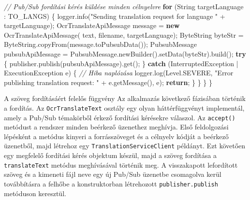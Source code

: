 \documentclass[
]{article}
\newenvironment{Shaded}{}{}
\newcommand{\BuiltInTok}[1]{\textcolor[rgb]{0.00,0.50,0.00}{#1}}
\newcommand{\CommentTok}[1]{\textcolor[rgb]{0.38,0.63,0.69}{\textit{#1}}}
\newcommand{\ControlFlowTok}[1]{\textcolor[rgb]{0.00,0.44,0.13}{\textbf{#1}}}
\newcommand{\FunctionTok}[1]{\textcolor[rgb]{0.02,0.16,0.49}{#1}}
\newcommand{\KeywordTok}[1]{\textcolor[rgb]{0.00,0.44,0.13}{\textbf{#1}}}
\newcommand{\NormalTok}[1]{#1}
\newcommand{\OperatorTok}[1]{\textcolor[rgb]{0.40,0.40,0.40}{#1}}
\newcommand{\StringTok}[1]{\textcolor[rgb]{0.25,0.44,0.63}{#1}}
\begin{document}
\begin{Shaded}
\begin{Highlighting}[]
    \CommentTok{// Pub/Sub fordítási kérés küldése minden célnyelvre}
    \ControlFlowTok{for} \OperatorTok{(}\BuiltInTok{String}\NormalTok{ targetLanguage }\OperatorTok{:}\NormalTok{ TO\_LANGS}\OperatorTok{)} \OperatorTok{\{}
\NormalTok{      logger}\OperatorTok{.}\FunctionTok{info}\OperatorTok{(}\StringTok{"Sending translation request for language "} \OperatorTok{+}\NormalTok{ targetLanguage}\OperatorTok{);}
\NormalTok{      OcrTranslateApiMessage message }\OperatorTok{=} \KeywordTok{new} \FunctionTok{OcrTranslateApiMessage}\OperatorTok{(}
\NormalTok{          text}\OperatorTok{,}\NormalTok{ filename}\OperatorTok{,}\NormalTok{ targetLanguage}\OperatorTok{);}
\NormalTok{      ByteString byteStr }\OperatorTok{=}\NormalTok{ ByteString}\OperatorTok{.}\FunctionTok{copyFrom}\OperatorTok{(}\NormalTok{message}\OperatorTok{.}\FunctionTok{toPubsubData}\OperatorTok{());}
\NormalTok{      PubsubMessage pubsubApiMessage }\OperatorTok{=}\NormalTok{ PubsubMessage}\OperatorTok{.}\FunctionTok{newBuilder}\OperatorTok{().}\FunctionTok{setData}\OperatorTok{(}\NormalTok{byteStr}\OperatorTok{).}\FunctionTok{build}\OperatorTok{();}
      \ControlFlowTok{try} \OperatorTok{\{}
\NormalTok{        publisher}\OperatorTok{.}\FunctionTok{publish}\OperatorTok{(}\NormalTok{pubsubApiMessage}\OperatorTok{).}\FunctionTok{get}\OperatorTok{();}
      \OperatorTok{\}} \ControlFlowTok{catch} \OperatorTok{(}\BuiltInTok{InterruptedException} \OperatorTok{|} \BuiltInTok{ExecutionException}\NormalTok{ e}\OperatorTok{)} \OperatorTok{\{}
        \CommentTok{// Hiba naplózása}
\NormalTok{        logger}\OperatorTok{.}\FunctionTok{log}\OperatorTok{(}\BuiltInTok{Level}\OperatorTok{.}\FunctionTok{SEVERE}\OperatorTok{,} \StringTok{"Error publishing translation request: "} \OperatorTok{+}\NormalTok{ e}\OperatorTok{.}\FunctionTok{getMessage}\OperatorTok{(),}\NormalTok{ e}\OperatorTok{);}
        \ControlFlowTok{return}\OperatorTok{;}
      \OperatorTok{\}}
    \OperatorTok{\}}
  \OperatorTok{\}}
\OperatorTok{\}}
\end{Highlighting}
\end{Shaded}

A szöveg fordításáért felelős függvény Az alkalmazás következő fázisában
történik a fordítás. Az \texttt{OcrTranslateText} osztály egy olyan
háttérfüggvényt implementál, amely a Pub/Sub témakörből érkező fordítási
kérésekre válaszol. Az \texttt{accept()} metódust a rendszer minden
beérkező üzenethez meghívja. Első feldolgozási lépésként a metódus
kinyeri a forrásszöveget és a célnyelv kódját a beérkező üzenetből, majd
létrehoz egy \texttt{TranslationServiceClient} példányt. Ezt követően
egy megfelelő fordítási kérés objektum készül, majd a szöveg fordítása a
\texttt{translateText} metódus meghívásával történik meg. A visszakapott
lefordított szöveg és a kimeneti fájl neve egy új Pub/Sub üzenetbe
csomagolva kerül továbbításra a felhőbe a konstruktorban létrehozott
\texttt{publisher.publish} metóduson keresztül.
\end{document}
